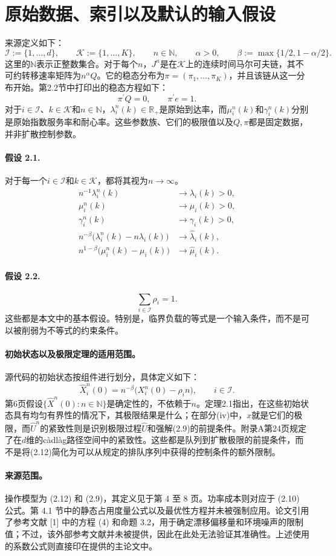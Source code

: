 \documentclass{article}
\begin{document}
\section*{原始数据、索引以及默认的输入假设}
来源定义如下：
\[
\mathcal I:=\{1,\ldots,d\},\qquad
\mathcal K:=\{1,\ldots,K\},\qquad n\in\mathbb N,
\qquad \alpha>0,
\qquad \beta:=\max\{1/2,1-\alpha/2\}.
\]
这里的\(\mathbb N\)表示正整数集合。对于每个\(n\)，\(J^n\)是在\(\mathcal K\)上的连续时间马尔可夫链，其不可约转移速率矩阵为\(n^\alpha Q\)。它的稳态分布为\(\pi=(\pi_1,\ldots,\pi_K)\)，并且该链从这一分布开始。第2.2节中打印出的稳态方程如下：
\[
\pi^\prime Q=0,\qquad \pi^\prime e=1.
\]
对于\(i\in\mathcal I\)、\(k\in\mathcal K\)和\(n\in\mathbb N\)，\(\lambda_i^n(k)\in\mathbb R_+\)是原始到达率，而\(\mu_i^n(k)\)和\(\gamma_i^n(k)\)分别是原始指数服务率和耐心率。这些参数族、它们的极限值以及\(Q,\pi\)都是固定数据，并非扩散控制参数。

\paragraph{假设 2.1.}
对于每一个\(i\in\mathcal I\)和\(k\in\mathcal K\)，都将其视为\(n\to\infty\)。
\[
\begin{aligned}
n^{-1}\lambda_i^n(k)&\longrightarrow\lambda_i(k)>0,\\
\mu_i^n(k)&\longrightarrow\mu_i(k)>0,\\
\gamma_i^n(k)&\longrightarrow\gamma_i(k)>0,\\
n^{-\beta}\bigl(\lambda_i^n(k)-n\lambda_i(k)\bigr)&\longrightarrow\hat\lambda_i(k),\\
n^{1-\beta}\bigl(\mu_i^n(k)-\mu_i(k)\bigr)&\longrightarrow\hat\mu_i(k).
\end{aligned}
\]
\paragraph{假设 2.2.}
\[
\sum_{i\in\mathcal I}\rho_i=1.
\]
这些都是本文中的基本假设。特别是，临界负载的等式是一个输入条件，而不是可以被削弱为不等式的约束条件。

\paragraph{初始状态以及极限定理的适用范围。}
源代码的初始状态按组件进行划分，具体定义如下：
\[
\hat X_i^n(0)=n^{-\beta}\bigl(X_i^n(0)-\rho_i n\bigr),\qquad i\in\mathcal I.
\]
第6页假设\(\{\hat X^n(0):n\in\mathbb N\}\)是确定性的，不依赖于\(n\)。定理2.1指出，在这些初始状态具有均匀有界性的情况下，其极限结果是什么；在部分(iv)中，\(x\)就是它们的极限，而\(\hat U^n\)的紧致性则是识别极限过程\(\hat U\)和强解(2.9)的前提条件。附录A第24页规定了在\(d\)维的c\`adl\`ag路径空间中的紧致性。这些都是队列到扩散极限的前提条件，而不是将(2.12)简化为可以从规定的排队序列中获得的控制条件的额外限制。

\paragraph{来源范围。}
操作模型为 (2.12) 和 (2.9)，其定义见于第 4 至 8 页。功率成本则对应于 (2.10) 公式。第 4.1 节中的静态占用度量公式以及最优性方程并未被强制应用。论文引用了参考文献 [1] 中的方程 (4) 和命题 3.2，用于确定漂移偏移量和环境噪声的限制值；不过，该外部参考文献并未被提供，因此在此处无法验证其准确性。上述使用的系数公式则直接印在提供的主论文中。
\end{document}
